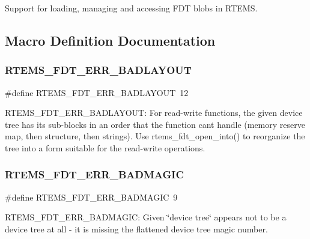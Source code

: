 Support for loading, managing and accessing F\+DT blobs in R\+T\+E\+MS. 

\subsection{Macro Definition Documentation}
\mbox{\label{rtems-fdt_8h_a1c970b5dd3c0b17772fed719b4f606b2}} 
\subsubsection{\texorpdfstring{RTEMS\_FDT\_ERR\_BADLAYOUT}{RTEMS\_FDT\_ERR\_BADLAYOUT}}
{\footnotesize\ttfamily \#define R\+T\+E\+M\+S\+\_\+\+F\+D\+T\+\_\+\+E\+R\+R\+\_\+\+B\+A\+D\+L\+A\+Y\+O\+UT~12}

R\+T\+E\+M\+S\+\_\+\+F\+D\+T\+\_\+\+E\+R\+R\+\_\+\+B\+A\+D\+L\+A\+Y\+O\+UT\+: For read-\/write functions, the given device tree has it\textquotesingle{}s sub-\/blocks in an order that the function can\textquotesingle{}t handle (memory reserve map, then structure, then strings). Use rtems\+\_\+fdt\+\_\+open\+\_\+into() to reorganize the tree into a form suitable for the read-\/write operations. \mbox{\label{rtems-fdt_8h_a1ade4d657298b170677b2a29f4e3c3b6}} 
\subsubsection{\texorpdfstring{RTEMS\_FDT\_ERR\_BADMAGIC}{RTEMS\_FDT\_ERR\_BADMAGIC}}
{\footnotesize\ttfamily \#define R\+T\+E\+M\+S\+\_\+\+F\+D\+T\+\_\+\+E\+R\+R\+\_\+\+B\+A\+D\+M\+A\+G\+IC~9}

R\+T\+E\+M\+S\+\_\+\+F\+D\+T\+\_\+\+E\+R\+R\+\_\+\+B\+A\+D\+M\+A\+G\+IC\+: Given \char`\"{}device tree\char`\"{} appears not to be a device tree at all -\/ it is missing the flattened device tree magic number. \mbox{\label{rtems-fdt_8h_aa3fc1bbe15934b882af1366e96be49f7}} 
